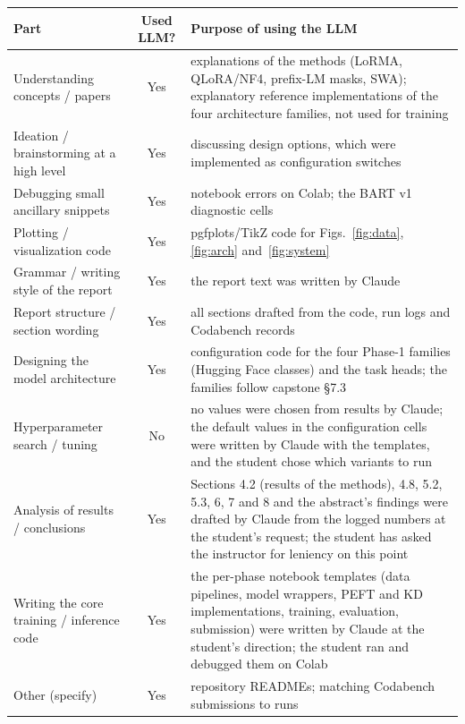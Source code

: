 \documentclass[11pt, oneside]{article}
\begin{document}
\begin{table}[H]
\centering
\small
\begin{tabular}{>{\raggedright\arraybackslash}p{4.6cm}|c|>{\raggedright\arraybackslash}p{7.2cm}}
\toprule
Part & Used LLM? & Purpose of using the LLM \\
\midrule
Understanding concepts / papers & Yes & explanations of the methods (LoRMA, QLoRA/NF4, prefix-LM masks, SWA); explanatory reference implementations of the four architecture families, not used for training \\
Ideation / brainstorming at a high level & Yes & discussing design options, which were implemented as configuration switches \\
Debugging small ancillary snippets & Yes & notebook errors on Colab; the BART v1 diagnostic cells \\
Plotting / visualization code & Yes & pgfplots/TikZ code for Figs.~\ref{fig:data}, \ref{fig:arch} and~\ref{fig:system} \\
Grammar / writing style of the report & Yes & the report text was written by Claude \\
Report structure / section wording & Yes & all sections drafted from the code, run logs and Codabench records \\
Designing the model architecture & Yes & configuration code for the four Phase-1 families (Hugging Face classes) and the task heads; the families follow capstone \S7.3 \\
Hyperparameter search / tuning & No & no values were chosen from results by Claude; the default values in the configuration cells were written by Claude with the templates, and the student chose which variants to run \\
Analysis of results / conclusions & Yes & Sections 4.2 (results of the methods), 4.8, 5.2, 5.3, 6, 7 and 8 and the abstract's findings were drafted by Claude from the logged numbers at the student's request; the student has asked the instructor for leniency on this point \\
Writing the core training / inference code & Yes & the per-phase notebook templates (data pipelines, model wrappers, PEFT and KD implementations, training, evaluation, submission) were written by Claude at the student's direction; the student ran and debugged them on Colab \\
Other (specify) & Yes & repository READMEs; matching Codabench submissions to runs \\
\bottomrule
\end{tabular}
\end{table}
\end{document}
